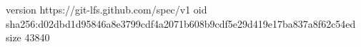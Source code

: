 version https://git-lfs.github.com/spec/v1
oid sha256:d02dbd1d95846a8e3799cdf4a2071b608b9cdf5e29d419e17ba837a8f62c54ed
size 43840
